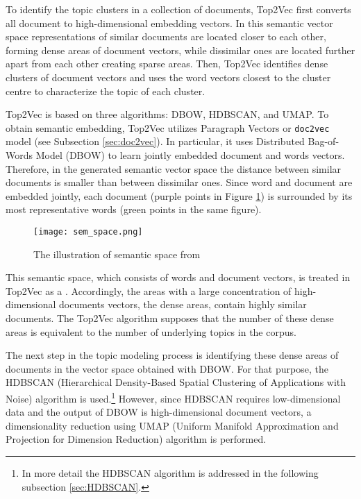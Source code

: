 \documentclass[fontsize=12pt,a4paper,twoside,openany]{scrbook}
\begin{document}
To identify the topic clusters in a collection of documents, Top2Vec first converts all document to high-dimensional embedding vectors. In this semantic vector space representations of similar documents are located closer to each other, forming dense areas of document vectors, while dissimilar ones are located further apart from each other creating sparse areas. Then, Top2Vec identifies dense clusters of document vectors and uses the word vectors closest to the cluster centre to characterize the topic of each cluster.

Top2Vec is based on three algorithms: DBOW, HDBSCAN, and UMAP. To obtain semantic embedding, Top2Vec utilizes Paragraph Vectors or \verb|doc2vec| model (see Subsection \ref{sec:doc2vec}). In particular, it uses Distributed Bag-of-Words Model (DBOW) to learn jointly embedded document and words vectors. Therefore, in the generated semantic vector space the distance between similar documents is smaller than between dissimilar ones. Since word and document are embedded jointly, each document (purple points in Figure \ref{fig:sem_space}) is surrounded by its most representative words (green points in the same figure).  

\begin{figure}[h]
\centering
\texttt{[image: sem\_space.png]}
\caption{The illustration of semantic space from \parencite{Angelov20}}
\label{fig:sem_space}
\end{figure}

This semantic space, which consists of words and document vectors, is treated in Top2Vec as a  \parencite[p.~3]{Angelov20}. Accordingly, the areas with a large concentration of high-dimensional documents vectors, the dense areas, contain highly similar documents. The Top2Vec algorithm supposes that the number of these dense areas is equivalent to the number of underlying topics in the corpus. 

The next step in the topic modeling process is identifying these dense areas of documents in the vector space obtained with DBOW. For that purpose, the HDBSCAN (Hierarchical Density-Based Spatial Clustering of Applications with Noise) \parencite{McInnes17b, McInnes17a} algorithm is used.\footnote{In more detail the HDBSCAN algorithm is addressed in the following subsection \ref{sec:HDBSCAN}.} However, since HDBSCAN requires low-dimensional data and the output of DBOW is high-dimensional document vectors, a dimensionality reduction using UMAP (Uniform Manifold Approximation and Projection for Dimension Reduction) algorithm \parencite{McInnes18, McInnes20} is performed.
\end{document}
